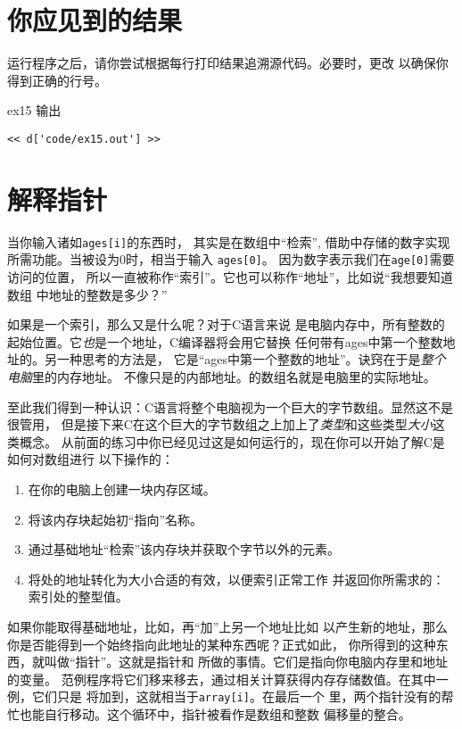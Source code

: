 \section{你应见到的结果}

运行程序之后，请你尝试根据每行打印结果追溯源代码。必要时，更改
以确保你得到正确的行号。

\begin{code}{ex15 输出}
\begin{lstlisting}
<< d['code/ex15.out'] >>
\end{lstlisting}
\end{code}


\section{解释指针}

当你输入诸如\verb|ages[i]|的东西时， 其实是在数组中“检索”,
借助中存储的数字实现所需功能。当被设为0时，相当于输入
\verb|ages[0]|。 因为数字表示我们在\verb|age[0]|需要访问的位置，
所以一直被称作“索引”。它也可以称作“地址”，比如说“我想要知道数组
中地址的整数是多少？”

如果是一个索引，那么又是什么呢？对于C语言来说
是电脑内存中，所有整数的起始位置。它\emph{也}是一个地址，C编译器将会用它替换
任何带有ages中第一个整数地址的。另一种思考的方法是，
它是“ages中第一个整数的地址”。诀窍在于是\emph{整个电脑}里的内存地址。
不像只是的内部地址。的数组名就是电脑里的实际地址。

至此我们得到一种认识：C语言将整个电脑视为一个巨大的字节数组。显然这不是很管用，
但是接下来C在这个巨大的字节数组之上加上了\emph{类型}和这些类型\emph{大小}这类概念。
从前面的练习中你已经见过这是如何运行的，现在你可以开始了解C是如何对数组进行
以下操作的：

\begin{enumerate}
\item 在你的电脑上创建一块内存区域。
\item 将该内存块起始初“指向”名称。
\item 通过基础地址“检索”该内存块并获取个字节以外的元素。
\item 将处的地址转化为大小合适的有效，以便索引正常工作
      并返回你所需求的：索引处的整型值。
\end{enumerate}

如果你能取得基础地址，比如，再“加”上另一个地址比如
以产生新的地址，那么你是否能得到一个始终指向此地址的某种东西呢？正式如此，
你所得到的这种东西，就叫做“指针”。这就是指针和
所做的事情。它们是指向你电脑内存里和地址的变量。
范例程序将它们移来移去，通过相关计算获得内存存储数值。在其中一例，它们只是
将加到，这就相当于\verb|array[i]|。在最后一个
里，两个指针没有的帮忙也能自行移动。这个循环中，指针被看作是数组和整数
偏移量的整合。

